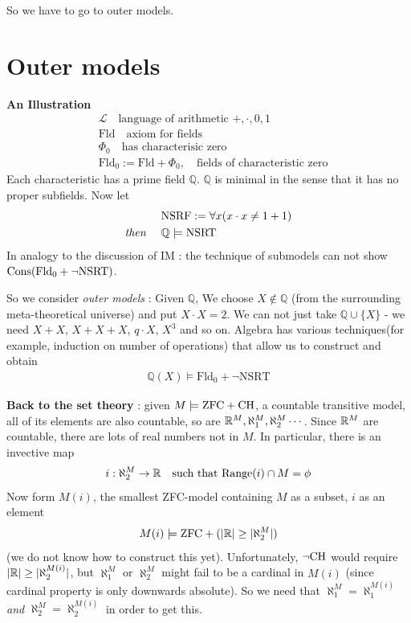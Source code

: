 \documentclass[12pt,a4paper]{article}
\begin{document}
So we have to go to outer models.

\section{Outer models}

\textbf{An Illustration}
\begin{align*}
& \mathscr{L} \quad \text{language of arithmetic } +, \cdot, 0,1 \\
& \text{Fld} \quad \text{axiom for fields} \\
& \Phi_0 \quad \text{has characterisic zero} \\
& \text{Fld}_0:= \text{Fld} + \Phi_0, \quad \text{fields of characteristic zero}
\end{align*}
Each characteristic has a prime field $\mathbb{Q}$. $\mathbb{Q}$ is minimal in the sense that it has no proper subfields. Now let
\begin{align*}
& \text{NSRF} := \forall x(x\cdot x \neq 1+1) \\
\emph{then } \quad & \mathbb{Q} \models \text{NSRT}
\end{align*}
In analogy to the discussion of IM : the technique of submodels can not show $\text{Cons} (\text{Fld}_0 + \neg \text{NSRT})$.

\quad So we consider \emph{outer models} : Given $\mathbb{Q}$, We choose $X\not\in \mathbb{Q}$ (from the surrounding meta-theoretical universe) and put $X\cdot X =2$. We can not just take $\mathbb{Q} \cup \{X\}$ - we need $X+X$, $X+X+X$, $q\cdot X$, $X^3$ and so on. Algebra has various techniques(for example, induction on number of operations) that allow us to construct and obtain
\begin{align*}
\mathbb{Q}(X) \models \text{Fld}_0 + \neg \text{NSRT}
\end{align*}
\s

\textbf{Back to the set theory} : given $M\models \text{ZFC} + \text{CH}$, a countable transitive model, all of its elements are also countable, so are $\mathbb{R}^M, \aleph_1^M, \aleph_2^M \cdots$. Since $\mathbb{R}^M$ are countable, there are lots of real numbers not in $M$. In particular, there is an invective map
\begin{align*}
i : \aleph_2^M \rightarrow \mathbb{R} \quad \text{such that } \text{Range}(i) \cap M = \phi
\end{align*}
Now form $M(i)$, the smallest ZFC-model containing $M$ as a subset, $i$ as an element
\begin{align*}
M(i) \models \text{ZFC} + (|\mathbb{R}| \geq |\aleph_2^M|)
\end{align*}
(we do not know how to construct this yet). Unfortunately, $\neg \text{CH}$ would require $|\mathbb{R}| \geq |\aleph_2^{M(i)}|$, but $\aleph_1^M$ or $\aleph_2^M$ might fail to be a cardinal in $M(i)$ (since cardinal property is only downwards absolute). So we need that $\aleph_1^M = \aleph_1^{M(i)}$ \emph{and} $\aleph_2^M = \aleph_2^{M(i)}$ in order to get this.
\end{document}
